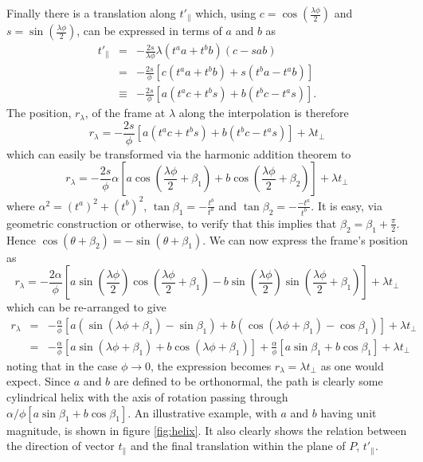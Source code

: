 Finally there is a translation along $t'_\parallel$ which, 
using $c = \cos\left(\frac{\lambda \phi}{2}\right)$ and $s = \sin\left(\frac{\lambda \phi}{2}\right)$,
can be expressed in terms of $a$ and $b$ as
\begin{eqnarray*}
t'_\parallel & = & - \frac{2s}{\lambda\phi} \lambda (t^a a + t^b b) (c - sab) \\
& = & -\frac{2s}{\phi} \left[c (t^a a + t^b b) + s ( t^b a - t^a b) \right]\\
& \equiv & -\frac{2s}{\phi} \left[a (t^a c + t^b s) + b ( t^b c - t^a s)\right].
\end{eqnarray*}
The position, $r_\lambda$, of the frame at $\lambda$ along the interpolation is therefore
\[
r_\lambda = -\frac{2s}{\phi} [a (t^a c + t^b s) + b ( t^b c - t^a s)] + \lambda t_\perp
\]
which can easily be transformed via the harmonic addition theorem to
\[
r_\lambda = -\frac{2s}{\phi} \alpha \left[ a \cos\left(\frac{\lambda\phi}{2} + \beta_1\right) + b \cos\left(\frac{\lambda\phi}{2} + \beta_2\right) \right] + \lambda t_\perp
\]
where $\alpha^2 = (t^a)^2 + (t^b)^2$, $\tan \beta_1 = - \frac{t^b}{t^a}$ and $\tan \beta_2 = - \frac{-t^a}{t^b}$. 
It is easy, via geometric construction or otherwise, to verify that this implies
that $\beta_2 = \beta_1 + \frac{\pi}{2}$. Hence $\cos(\theta + \beta_2) = - \sin(\theta + \beta_1)$. We can now express the frame's position as
\[
r_\lambda = -\frac{2\alpha}{\phi} \left[ a \sin\left(\frac{\lambda\phi}{2}\right)\cos\left(\frac{\lambda\phi}{2} + \beta_1\right) - b \sin\left(\frac{\lambda\phi}{2}\right)\sin\left(\frac{\lambda\phi}{2} + \beta_1\right) \right] + \lambda t_\perp
\]
which can be re-arranged to give
\begin{eqnarray*}
r_\lambda & = & -\frac{\alpha}{\phi} \left[ a \left(\sin\left(\lambda\phi + \beta_1\right) - \sin\beta_1\right)
+ b \left(\cos\left(\lambda\phi + \beta_1\right) - \cos\beta_1\right) \right] + \lambda t_\perp \\
& = & -\frac{\alpha}{\phi} \left[ a \sin\left(\lambda\phi + \beta_1\right)
+ b \cos\left(\lambda\phi + \beta_1\right) \right] + \frac{\alpha}{\phi} \left[
a \sin \beta_1 + b \cos \beta_1
\right] + \lambda t_\perp 
\end{eqnarray*}
noting that in the case $\phi \rightarrow 0$, the expression becomes $r_\lambda = \lambda t_\perp$ as one would
expect. Since $a$ and $b$ are defined to be orthonormal, the path is clearly some cylindrical helix with the axis of rotation passing through 
$\alpha/\phi  \left[ a \sin \beta_1 + b \cos \beta_1 \right]$.
An illustrative example, with $a$ and $b$ having
unit magnitude, is shown in figure \ref{fig:helix}. It also clearly shows the relation between the direction of
vector $t_\parallel$ and the final translation within the plane of $P$, $t'_\parallel$.

